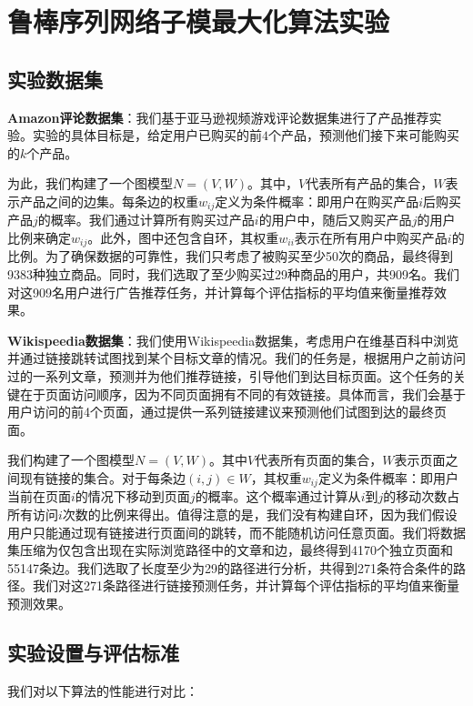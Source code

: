 \section{鲁棒序列网络子模最大化算法实验}

\subsection{实验数据集}

{\bfseries Amazon评论数据集}：我们基于亚马逊视频游戏评论数据集\cite{ni2019justifying}进行了产品推荐实验。实验的具体目标是，给定用户已购买的前$4$个产品，预测他们接下来可能购买的$k$个产品。

为此，我们构建了一个图模型$N = (V,W)$。其中，$V$代表所有产品的集合，$W$表示产品之间的边集。每条边的权重$w_{ij}$定义为条件概率：即用户在购买产品$i$后购买产品$j$的概率。我们通过计算所有购买过产品$i$的用户中，随后又购买产品$j$的用户比例来确定$w_{ij}$。此外，图中还包含自环，其权重$w_{ii}$表示在所有用户中购买产品$i$的比例。为了确保数据的可靠性，我们只考虑了被购买至少50次的商品，最终得到9383种独立商品。同时，我们选取了至少购买过29种商品的用户，共909名。我们对这909名用户进行广告推荐任务，并计算每个评估指标的平均值来衡量推荐效果。

{\bfseries Wikispeedia数据集}：我们使用Wikispeedia数据集\cite{west2009wikispeedia}，考虑用户在维基百科中浏览并通过链接跳转试图找到某个目标文章的情况。我们的任务是，根据用户之前访问过的一系列文章，预测并为他们推荐链接，引导他们到达目标页面。这个任务的关键在于页面访问顺序，因为不同页面拥有不同的有效链接。具体而言，我们会基于用户访问的前4个页面，通过提供一系列链接建议来预测他们试图到达的最终页面。

我们构建了一个图模型$N = (V,W)$。其中$V$代表所有页面的集合，$W$表示页面之间现有链接的集合。对于每条边$(i,j)\in W$，其权重$w_{ij}$定义为条件概率：即用户当前在页面$i$的情况下移动到页面$j$的概率。这个概率通过计算从$i$到$j$的移动次数占所有访问$i$次数的比例来得出。值得注意的是，我们没有构建自环，因为我们假设用户只能通过现有链接进行页面间的跳转，而不能随机访问任意页面。我们将数据集压缩为仅包含出现在实际浏览路径中的文章和边，最终得到4170个独立页面和55147条边。我们选取了长度至少为29的路径进行分析，共得到271条符合条件的路径。我们对这271条路径进行链接预测任务，并计算每个评估指标的平均值来衡量预测效果。

\subsection{实验设置与评估标准}

我们对以下算法的性能进行对比：

